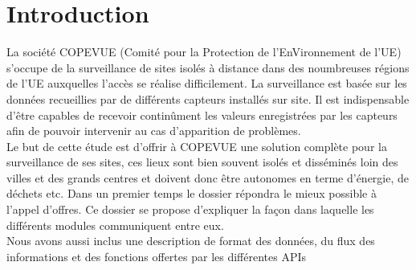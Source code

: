 \section{Introduction}

La société COPEVUE (Comité pour la Protection de l’EnVironnement de l’UE) s’occupe de la surveillance de sites isolés à distance dans des noumbreuses régions de l'UE auxquelles l’accès se réalise difficilement. La surveillance est basée sur les données recueillies par de différents capteurs installés sur site. Il est indispensable d’être capables de recevoir continûment les valeurs enregistrées par les capteurs afin de pouvoir intervenir au cas d’apparition de problèmes. \\
Le but de cette étude est d’offrir à COPEVUE une solution complète pour la surveillance de ses sites, ces lieux sont bien souvent isolés et disséminés loin des villes et des grands centres et doivent donc être autonomes en terme d’énergie, de déchets etc.
Dans un premier temps le dossier répondra le mieux possible à l’appel d’offres. Ce dossier se propose d’expliquer la façon dans laquelle les différents modules communiquent entre eux. \\
Nous avons aussi inclus une description de format des données, du flux des informations et des fonctions offertes par les différentes APIs

\vfill
\pagebreak
